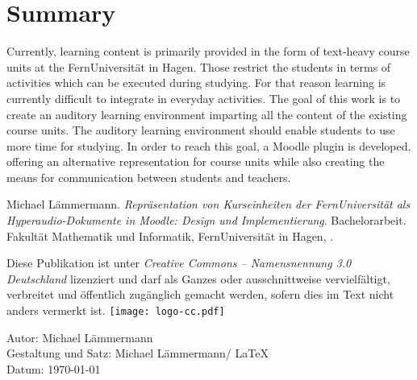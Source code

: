 \documentclass[twoside,bibliography=totoc,openany,numbers=noenddot]{fumi}
\newcommand{\thesistitle}{Repräsentation von Kurseinheiten der FernUniversität als Hyperaudio-Dokumente in Moodle: Design und Implementierung}
\newcommand{\thesisauthor}{Michael Lämmermann}
\newcommand{\thesistype}{Bachelorarbeit} %
\begin{document}
\section*{Summary}
Currently, learning content is primarily provided in the form of text-heavy course units at the FernUniversität in Hagen. Those restrict the students in terms of activities which can be executed during studying. For that reason learning is currently difficult to integrate in everyday activities. The goal of this work is to create an auditory learning environment imparting all the content of the existing course units. The auditory learning environment should enable students to use more time for studying. In order to reach this goal, a Moodle plugin is developed, offering an alternative representation for course units while also creating the means for communication between students and teachers.
\vfill\newpage

{\small

\thesisauthor. \textit{\thesistitle}. \thesistype. Fakultät Mathematik und Informatik, FernUniversität in Hagen, \the\year. %
\\\vfill

Diese Publikation ist unter \emph{Creative Commons -- Namensnennung 3.0 Deutschland} lizenziert und darf als Ganzes oder ausschnittweise vervielfältigt, verbreitet und öffentlich zugänglich gemacht werden, sofern dies im Text nicht anders vermerkt ist.\newline\vspace{10pt}
\hspace{-9pt}\texttt{[image: logo-cc.pdf]}
\\\vspace{10pt}

Autor: \thesisauthor\\
Gestaltung und Satz: \thesisauthor / \LaTeX\\
Datum: \today\\
\cleardoublepage
}

\pagestyle{headings}
\tableofcontents

\end{document}
